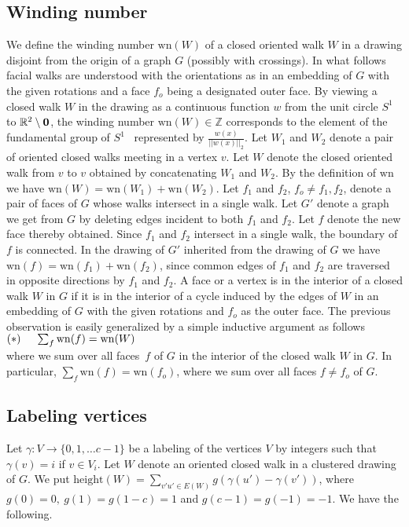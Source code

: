 \documentclass{llncs}
\def\wn{\mathrm{wn}}
\def\length{\mathrm{height}}
\begin{document}
\subsection{Winding number} 
\label{sec:wnwn1}
We define the winding number $\wn(W)$ of a closed oriented walk $W$ in a drawing disjoint from the origin of a graph $G$ (possibly with crossings). In what follows  facial walks are understood with the orientations as in
  an embedding of $G$ with the given rotations and a face $f_o$ being a designated outer face.
By viewing a closed walk $W$ in the drawing  as a continuous  function $w$ from the unit circle $S^1$ to $\mathbb{R}^2\setminus {\bf 0}$,
the winding number $\wn(W)\in \mathbb{Z}$ corresponds to the element of the fundamental group of  $S^1$~\cite[Chapter 1.1]{Hatch02}  represented by $\frac{w(x)}{||w(x)||_2}$.
Let $W_1$ and $W_2$ denote a pair of oriented closed walks meeting in a vertex $v$.
Let $W$ denote the closed oriented walk from $v$ to $v$ obtained by concatenating $W_1$ and $W_2$.
By the definition of $\wn$ we have $\wn(W)=\wn(W_1)+\wn(W_2)$.
Let $f_1$ and $f_2$, $f_o\not = f_1, f_2$, denote a pair of faces of $G$ whose walks intersect in a single walk.
Let $G'$ denote a graph we get from $G$ by deleting edges incident to both $f_1$ and $f_2$.
Let $f$ denote the new face thereby obtained. Since $f_1$ and $f_2$ intersect in a single walk, the boundary of $f$ is connected.
In the drawing of $G'$ inherited from the drawing of $G$ we have $\wn(f)=\wn(f_1)+\wn(f_2)$, since common edges of $f_1$ and $f_2$ are traversed
in opposite directions by $f_1$ and $f_2$.
A face  or a vertex is in the interior of a closed walk $W$ in $G$ if it is in the interior of 
a cycle induced by the edges of $W$ in an embedding of $G$ with the given rotations and  $f_o$ as the outer face.
The previous observation is easily generalized by a simple inductive argument 
as follows \\
$ {\bf (*)} \ \ \ \   \sum_f \wn(f)=\wn(W)$ \\
 where we sum over all  faces~$f$ of $G$ in the interior of the
closed walk $W$ in $G$. In particular, $\sum_f \wn(f)=\wn(f_o)$, where we sum over all 
 faces  $f\not=f_o$ of $G$.

\subsection{Labeling vertices} 
\label{sec:wnwn}
Let $\gamma:V \rightarrow \{0,1,\ldots c-1\}$ be a labeling of the vertices $V$ by integers
such that $\gamma(v) = i$ if $v\in V_i$.
 Let $W$ denote an oriented closed  walk in a clustered drawing of  $G$. We put $\length(W)=
\sum_{{v'u'}\in E(W)} g(\gamma(u')-\gamma(v'))$,
 where $g(0)=0, \ g(1)=g(1-c)=1$ and $g(c-1)=g(-1)=-1$.
We have the following.
\end{document}
